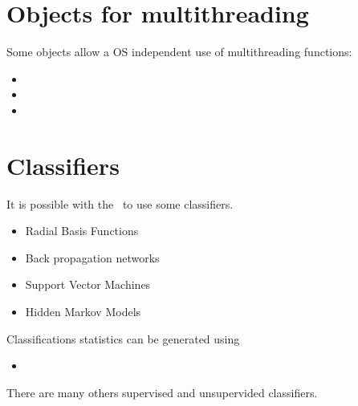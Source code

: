 \section{Objects for multithreading}\label{system}
 Some objects allow a OS independent use of multithreading functions:\begin{itemize}
\item
{}\item
{}\item
{}\end{itemize}
\section{Classifiers}\label{classifiers}
 It is possible with the \ltilib\ to use some classifiers. \begin{itemize}
\item {} Radial Basis Functions
\item {} Back propagation networks
\item {} Support Vector Machines
\item {} Hidden Markov Models
\end{itemize}
Classifications statistics can be generated using
 \begin{itemize}
\item {}
\end{itemize}

There are many others supervised and unsupervided classifiers.  

